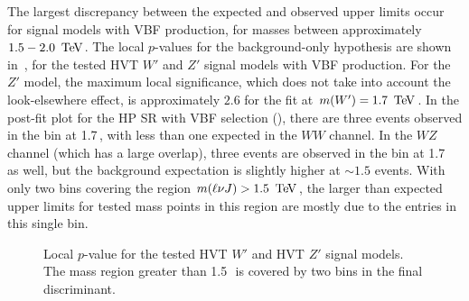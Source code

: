 The largest discrepancy between the expected and observed upper limits occur for signal models with VBF production, for masses between approximately $1.5-2.0\,\TeV$. The local $p$-values for the background-only hypothesis are shown in~\Fig{\ref{fig:p0}},  for the tested HVT $W'$ and $Z'$ signal models with VBF production. For the $Z'$ model, the maximum local significance, which does not take into account the look-elsewhere effect, is approximately $2.6$ for the fit at $m(W')=1.7\,\TeV$. In the post-fit plot for the HP SR with VBF selection (\Fig{\ref{fig:pf_hp_vbf}}), there are three events observed in the bin at 1.7\,\TeV, with less than one expected in the $WW$ channel. In the $WZ$ channel (which has a large overlap), three events are observed in the bin at 1.7\,\TeV\, as well, but the background expectation is slightly higher at $\sim1.5$ events. With only two bins covering the region $m(\ell\nu J)>1.5\,\TeV$, the larger than expected upper limits for tested mass points in this region are mostly due to the entries in this single bin.


\begin{figure}[H]
\centering
{}
\caption[Local $p$-value for HVT signal (vector boson fusion selection)]{Local $p$-value for the tested \protect{} HVT $W'$ and \protect{} HVT $Z'$ signal models. The mass region greater than 1.5\,\TeV\, is covered by two bins in the final discriminant. }
\label{fig:p0}
\end{figure}

